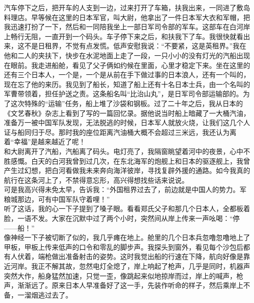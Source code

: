 汽车停下之后，把开车的人支到一边，过来打开了车箱，扶我出来，一同进了敷岛料理店。早等候在这里的日本军官，叫大尉，他拿出了一件日本军大衣和军帽，把我迅速打扮了一下，然后和一同陪我坐上一部日军司令部的军车。这部车在白河岸上畅行无阻，一直开到一个码头。车子停下来之后，和扶我下了车。我很快就看出来，这不是日租界，不觉有点发慌。低声安慰我说：“不要紧，这是英租界。”我在他和二人的夹扶下，快步在水泥地面上走了一段，一只小小的没有灯光的汽船出现在眼前。我走进船舱，看见了父子俩如约候在里面，心里才稳定下来。坐在这里的还有三个日本人，一个是，一个是从前在手下做过事的日本浪人，还有一个叫的，现在忘了他的来历。我见到了船长，知道了船上还有十名日本士兵，由一个名叫的军曹带领着，担任护送之责。这条船名叫“比治山丸”，是日军司令部运输部的。为了这次特殊的“运输”任务，船上堆了沙袋和钢板。过了二十年之后，我从日本的《文艺春秋》杂志上看到了写的一篇回忆录。据他说当时船上暗藏了一大桶汽油，准备万一被中国军队发现，无法脱逃的时候，日本军人就放火烧，让我们这几个人证与船同归于尽。那时我的座位距离汽油桶大概不会超过三米远，我还认为离着“幸福”是越来越近了呢！\\

和大尉离开了汽船，汽船离了码头。电灯亮了，我隔窗眺望着河中的夜景，心中不胜感慨。白天的白河我曾到过几次，在东北海军的炮舰上和日本的驱逐舰上，我曾产生过幻想，把白河看做我未来奔向海洋彼岸，寻找复辟外援的通路。如今我真的航行在这条河上了，不禁得意忘形，高兴得想找些话来说说。\\

可是我高兴得未免太早，告诉我：“外国租界过去了，前边就是中国人的势力。军粮城那边，可有中国军队守着哩！”\\

听了这话，我的心一下子提到了嗓子眼。看看郑氏父子和那几个日本人，全都板着脸，一语不发。大家在沉默中过了两个小时，突然间从岸上传来一声吆喝：“停——船！”\\

像神经一下子被切断了似的，我几乎瘫在地上。舱里的几个日本兵忽噜忽噜地上了甲板，甲板上传来低声的口令和零乱的脚步声。我探头到窗外，看见每个沙包后都有人伏着，端枪做出准备射击的姿势。这时我觉出船的行速在下降，航向好像是靠近河岸。我正不解其故，忽然电灯全熄了，岸上响起了枪声，几乎是同时，机器声突然大作，船身猛然加速，只觉一歪，像跳起来似地掠岸而过，岸上的喊声，枪声，渐渐远了。原来日本人早准备好了这一手，先装作听命的样子，然后乘岸上不备，一溜烟逃过去了。\\

